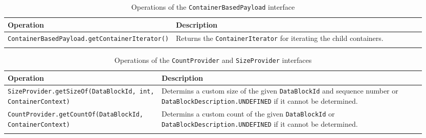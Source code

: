\small
\begin{landscape}
\begin{longtable}{|p{0.3\linewidth}|p{0.65\linewidth}|}
\hline
\rowcolor[gray]{.9}\textbf{Operation} & \textbf{Description} \\
\endhead
\hline
\texttt{ContainerBasedPayload}\linebreak\texttt{.getContainerIterator()} & Returns the \texttt{ContainerIterator} for iterating the child containers. \\
\hline
\caption{Operations of the \texttt{ContainerBasedPayload} interface}
\label{tab:DBOpsContainerBasedPayload}
\end{longtable}
\end{landscape}
\normalsize

\small
\begin{landscape}
\begin{longtable}{|p{0.35\linewidth}|p{0.6\linewidth}|}
\hline
\rowcolor[gray]{.9}\textbf{Operation} & \textbf{Description} \\
\endhead
\hline
\texttt{SizeProvider}\linebreak\texttt{.getSizeOf(DataBlockId, int, ContainerContext)} & Determins a custom size of the given \texttt{DataBlockId} and sequence number or \texttt{DataBlockDescription.UNDEFINED} if it cannot be determined. \\
\hline
\texttt{CountProvider}\linebreak\texttt{.getCountOf(DataBlockId, ContainerContext)} & Determins a custom count of the given \texttt{DataBlockId} or \texttt{DataBlockDescription.UNDEFINED} if it cannot be determined. \\
\hline
\caption{Operations of the \texttt{CountProvider} and \texttt{SizeProvider} interfaces}
\label{tab:DBOpsCountProvider}
\end{longtable}
\end{landscape}
\normalsize

